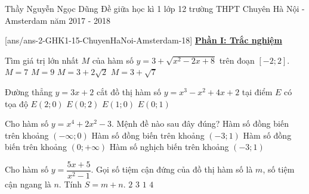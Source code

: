\begin{name}
{Thầy Nguyễn Ngọc Dũng}
{Đề giữa học kì 1 lớp 12 trường THPT Chuyên Hà Nội - Amsterdam năm 2017 - 2018}
\end{name}

\setcounter{ex}{0}
[ans/ans-2-GHK1-15-ChuyenHaNoi-Amsterdam-18]
\textbf{\underline{Phần I: Trắc nghiệm}}
\begin{ex}%
Tìm giá trị lớn nhất $M$ của hàm số $y=3+\sqrt{x^2-2x+8}$ trên đoạn $[-2;2].$
\choice
{\True $M=7$}
{$M=9$}
{$M=3+2\sqrt{2}$}
{$M=3+\sqrt{7}$}
\end{ex}

\begin{ex}%
Đường thẳng $y=3x+2$ cắt đồ thị hàm số $y=x^3-x^2+4x+2$ tại điểm $E$ có tọa độ
\choice
{$E(2;0)$}
{\True $E(0;2)$}
{$E(1;0)$}
{$E(0;1)$}
\end{ex}

\begin{ex}%
Cho hàm số $y=x^4+2x^2-3$. Mệnh đề nào sau đây đúng?
\choice
{Hàm số đồng biến trên khoảng $(-\infty;0)$}
{Hàm số đồng biến trên khoảng $(-3;1)$}
{\True Hàm số đồng biến trên khoảng $(0;+\infty)$}
{Hàm số nghịch biến trên khoảng $(-3;1)$}
\end{ex}

\begin{ex}%
Cho hàm số $y=\dfrac{5x+5}{x^2-1}$. Gọi số tiệm cận đứng của đồ thị hàm số là $m$, số tiệm cận ngang là $n$. Tính $S=m+n$.
\choice
{\True $2$}
{$3$}
{$1$}
{$4$}
\end{ex}

